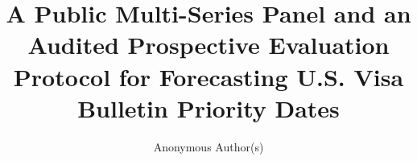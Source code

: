 \documentclass[runningheads]{llncs}
\begin{document}
\title{A Public Multi-Series Panel and an Audited Prospective
Evaluation Protocol for Forecasting U.S. Visa Bulletin Priority Dates}

\author{Anonymous Author(s)}

\maketitle
\end{document}
